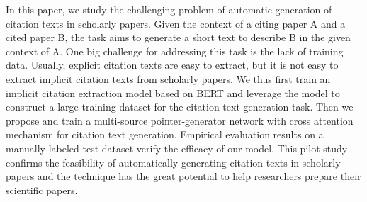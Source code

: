 In this paper, we study the challenging problem of automatic generation of citation texts in scholarly papers. Given the context of a citing paper A and a cited paper B, the task aims to generate a short text to describe B in the given context of A. One big challenge for addressing this task is the lack of training data. Usually, explicit citation texts are easy to extract, but it is not easy to extract implicit citation texts from scholarly papers. We thus first train an implicit citation extraction model based on BERT and leverage the model to construct a large training dataset for the citation text generation task. Then we propose and train a multi-source pointer-generator network with cross attention mechanism for citation text generation. Empirical evaluation results on a manually labeled test dataset verify the efficacy of our model. This pilot study confirms the feasibility of automatically generating citation texts in scholarly papers and the technique has the great potential to help researchers prepare their scientific papers.
